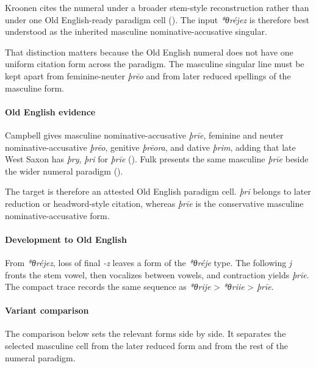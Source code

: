 \documentclass[
  british,
  a4paper,
]{article}
\begin{document}
Kroonen cites the numeral under a broader stem-style reconstruction
rather than under one Old English-ready paradigm cell
(). The input
\emph{*θréjez} is therefore best understood as the inherited masculine
nominative-accusative singular.

That distinction matters because the Old English numeral does not have
one uniform citation form across the paradigm. The masculine singular
line must be kept apart from feminine-neuter \emph{þrēo} and from later
reduced spellings of the masculine form.

\paragraph{Old English evidence}\label{old-english-evidence-2}

Campbell gives masculine nominative-accusative \emph{þrīe}, feminine and
neuter nominative-accusative \emph{þrēo}, genitive \emph{þrēora}, and
dative \emph{þrim}, adding that late West Saxon has \emph{þry},
\emph{þri} for \emph{þrīe} (). Fulk presents the same masculine \emph{þrīe} beside the
wider numeral paradigm ().

The target is therefore an attested Old English paradigm cell.
\emph{þrī} belongs to later reduction or headword-style citation,
whereas \emph{þrīe} is the conservative masculine nominative-accusative
form.

\paragraph{Development to Old
English}\label{development-to-old-english-2}

From \emph{*θréjez}, loss of final \emph{-z} leaves a form of the
\emph{*θréje} type. The following \emph{j} fronts the stem vowel, then
vocalizes between vowels, and contraction yields \emph{þrīe}. The
compact trace records the same sequence as \emph{*θrije} \textgreater{}
\emph{*θriie} \textgreater{} \emph{þrīe}.

\paragraph{Variant comparison}\label{variant-comparison-2}

The comparison below sets the relevant forms side by side. It separates
the selected masculine cell from the later reduced form and from the
rest of the numeral paradigm.
\end{document}
